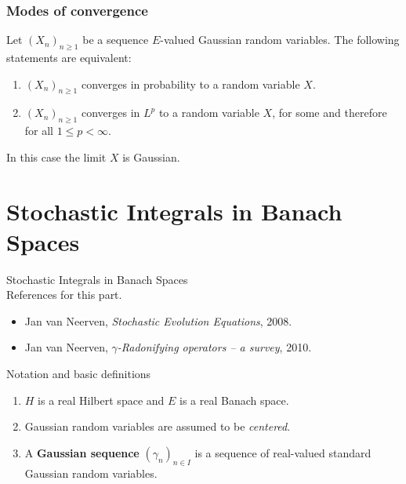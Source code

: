 \begin{frame}
    \frametitle{Modes of convergence}
    
    Let $(X_n)_{n\geq 1}$ be a sequence $E$-valued Gaussian random variables. 
    The following statements are equivalent: 
    \begin{enumerate}
        \item $(X_n)_{n \geq 1}$ converges in probability to a random variable $X$. 
        \item $(X_n)_{n \geq 1}$ converges  in $L^p$ to a random variable $X$,
            for some and therefore for all $1 \leq p < \infty$.
    \end{enumerate}
    In this case the limit $X$ is Gaussian.
\end{frame}
















\section{Stochastic Integrals in Banach Spaces}

\begin{frame}

    {\LARGE{Stochastic Integrals in Banach Spaces}}\\[1.5cm]

    References for this part.

    \begin{itemize}
        \item Jan van Neerven, \emph{{Stochastic Evolution Equations}}, 2008.
        \item Jan van Neerven, \emph{{$\gamma$-Radonifying operators -- a survey}}, 2010.
    \end{itemize}
\end{frame}


\begin{frame}
    {Notation and basic definitions}

    \begin{enumerate}
        \item $H$ is a real Hilbert space and $E$ is a real Banach space. 
        \item Gaussian random variables are assumed to be \emph{centered}.
        \item A \textbf{Gaussian sequence} $(\gamma_n)_{n \in I}$ is a sequence of
            real-valued standard Gaussian random variables.
    \end{enumerate}
\end{frame}


